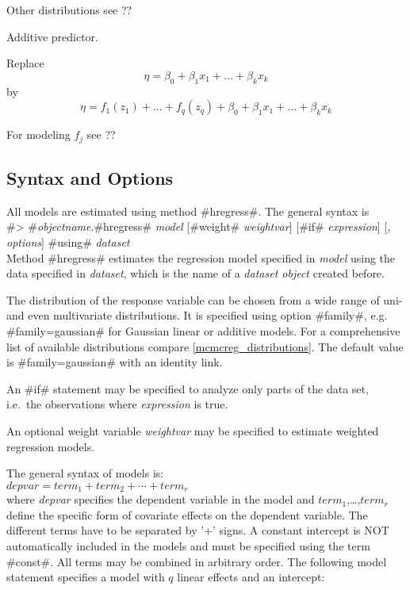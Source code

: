 Other distributions see ??

Additive predictor.

Replace
$$
\eta = \beta_0 + \beta_1 x_1 + \ldots + \beta_k x_k
$$
by
$$
\eta = f_1(z_{1}) + \ldots + f_q(z_{q}) + \beta_0 + \beta_1 x_{1} + \ldots + \beta_k x_{k}
$$

For modeling $f_j$ see ??

\subsection{Syntax and Options}

All models are estimated using method #hregress#. The general syntax is \\

#> #{\em objectname}.#hregress# {\em model} [#weight# {\em weightvar}] [#if# {\em expression}] [{\em , options}] #using# {\em dataset} \\

Method #hregress# estimates the regression model specified in {\em
model} using the data specified in {\em dataset}, which is
the name of a {\em dataset object} created before.

The distribution of the response variable can be chosen from a wide
range of uni- and even multivariate distributions. It is
specified using option
#family#, e.g. #family=gaussian# for Gaussian linear or additive models.
For a comprehensive list of available distributions compare \autoref{mcmcreg_distributions}.
The default value is #family=gaussian#
with an identity link.

An #if# statement may be specified to analyze
only parts of the data set, i.e.~the observations where {\em
expression} is true.

An optional weight variable {\em weightvar} may be specified to
estimate weighted regression models.


The general syntax of models is: \\

$depvar = term_1 + term_2 + \cdots + term_r$ \\

where {\em depvar} specifies the dependent variable in the model
and $term_1$,\dots,$term_r$ define the specific form of covariate
effects on the dependent variable. The different terms have to be
separated by '+' signs. A constant intercept is NOT automatically
included in the models and must be specified using the term #const#.
All terms may be combined
in arbitrary order.
The following model statement specifies a model with $q$ linear effects and an intercept: \\

